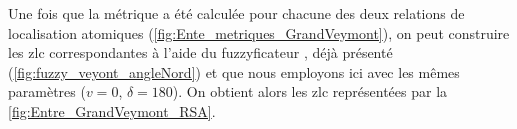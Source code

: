 Une fois que la métrique a été calculée pour chacune des deux
relations de localisation atomiques
(\autoref{fig:Ente_metriques_GrandVeymont}), on peut construire les
\ac{zlc} correspondantes à l'aide du fuzzyficateur
, déjà présenté
(\autoref{fig:fuzzy_veyont_angleNord}) et que nous employons ici avec
les mêmes paramètres (\(v = 0\), \(\delta=180\)). On obtient alors les
\ac{zlc} représentées par la \autoref{fig:Entre_GrandVeymont_RSA}.

\begin{figure}
  \centering
  \hspace{1cm}

\end{figure}
